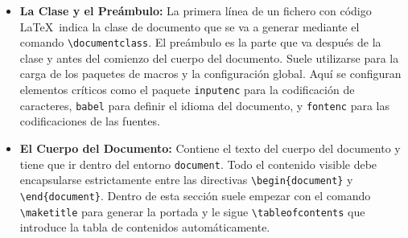 \begin{itemize}
    \item \textbf{La Clase y el Preámbulo:} La primera línea de un fichero con código \LaTeX\ indica la clase de documento que se va a generar mediante el comando \texttt{\textbackslash documentclass}. El preámbulo es la parte que va después de la clase y antes del comienzo del cuerpo del documento. Suele utilizarse para la carga de los paquetes de macros y la configuración global. Aquí se configuran elementos críticos como el paquete \texttt{inputenc} para la codificación de caracteres, \texttt{babel} para definir el idioma del documento, y \texttt{fontenc} para las codificaciones de las fuentes.
    
    \item \textbf{El Cuerpo del Documento:} Contiene el texto del cuerpo del documento y tiene que ir dentro del entorno \texttt{document}. Todo el contenido visible debe encapsularse estrictamente entre las directivas \texttt{\textbackslash begin\{document\}} y \texttt{\textbackslash end\{document\}}. Dentro de esta sección suele empezar con el comando \texttt{\textbackslash maketitle} para generar la portada y le sigue \texttt{\textbackslash tableofcontents} que introduce la tabla de contenidos automáticamente.
\end{itemize}